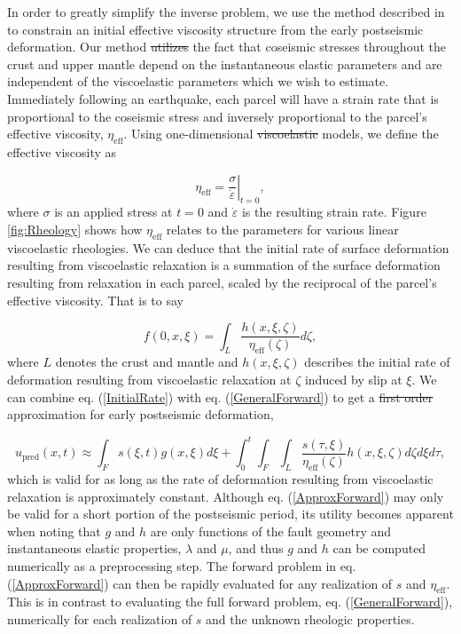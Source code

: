 \documentclass[draft,linenumbers]{AGUJournal}
\providecommand{\DIFadd}[1]{{\protect\color{blue}\uwave{#1}}} %
\providecommand{\DIFdel}[1]{{\protect\color{red}\sout{#1}}}                      %
\providecommand{\DIFaddbegin}{} %
\providecommand{\DIFaddend}{} %
\providecommand{\DIFdelbegin}{} %
\providecommand{\DIFdelend}{} %
\begin{document}
In order to greatly simplify the inverse problem, we use the method described in \citet{Hines2016} to constrain an initial effective viscosity structure from the early postseismic deformation.  Our method \DIFdelbegin \DIFdel{utilizes }\DIFdelend \DIFaddbegin \DIFadd{uses }\DIFaddend the fact that coseismic stresses throughout the crust and upper mantle depend on the instantaneous elastic parameters and are independent of the viscoelastic parameters which we wish to estimate. Immediately following an earthquake, each parcel will have a strain rate that is proportional to the coseismic stress and inversely proportional to the parcel's effective viscosity, $\eta_\mathrm{eff}$.  Using one-dimensional \DIFdelbegin \DIFdel{viscoelastic }\DIFdelend \DIFaddbegin \DIFadd{rheologic }\DIFaddend models, we define the effective viscosity as

\begin{equation}
  \eta_\mathrm{eff} = \left.\frac{\sigma}{\dot{\varepsilon}}\right|_{t=0},
\end{equation}
where $\sigma$ is an applied stress at $t=0$ and $\dot\varepsilon$ is the resulting strain rate.  Figure \ref{fig:Rheology} shows how $\eta_\mathrm{eff}$ relates to the parameters for various linear viscoelastic rheologies.   We can deduce that the initial rate of surface deformation resulting from viscoelastic relaxation is a summation of the surface deformation resulting from relaxation in each parcel, scaled by the reciprocal of the parcel's effective viscosity.  That is to say   

\begin{equation}\label{InitialRate}
  f(0,x,\xi) = \int_L \frac{h(x,\xi,\zeta)}{\eta_\mathrm{eff}(\zeta)} d\zeta, 
\end{equation}
where $L$ denotes the crust and mantle and $h(x,\xi,\zeta)$ describes the initial rate of deformation resulting from viscoelastic relaxation at $\zeta$ induced by slip at $\xi$. We can combine eq. (\ref{InitialRate}) with eq. (\ref{GeneralForward}) to get a \DIFdelbegin \DIFdel{first order }\DIFdelend \DIFaddbegin \DIFadd{first-order }\DIFaddend approximation for early postseismic deformation,

\begin{equation}\label{ApproxForward}
  u_\mathrm{pred}(x,t) \approx \int_F s(\xi,t)g(x,\xi)d\xi + 
           \int_0^t\int_F\int_L \frac{s(\tau,\xi)}{\eta_\mathrm{eff}(\zeta)} h(x,\xi,\zeta) d\zeta d\xi d\tau,
\end{equation}
which is valid for as long as the rate of deformation resulting from viscoelastic relaxation is approximately constant.  Although eq. (\ref{ApproxForward}) may only be valid for a short portion of the postseismic period, its utility becomes apparent when noting that $g$ and $h$ are only functions of the fault geometry and instantaneous elastic properties, $\lambda$ and $\mu$, and thus $g$ and $h$ can be computed numerically as a preprocessing step.  The forward problem in eq. (\ref{ApproxForward}) can then be rapidly evaluated for any realization of $s$ and $\eta_{\mathrm{eff}}$.  This is in contrast to evaluating the full forward problem, eq. (\ref{GeneralForward}), numerically for each realization of $s$ and the unknown rheologic properties. 
\end{document}
